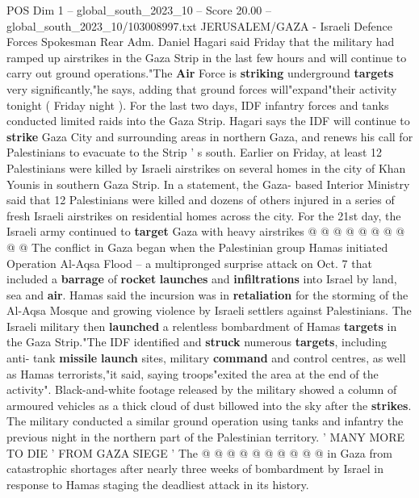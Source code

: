 \begin{textsample}{POS Dim 1 – global\_south\_2023\_10 – Score 20.00 – global\_south\_2023\_10/103008997.txt}  \label{ex:f1_pos_056}
JERUSALEM/GAZA - Israeli Defence Forces Spokesman Rear Adm.
Daniel Hagari said Friday that the military had ramped up airstrikes in the Gaza Strip in the last few hours and will continue to carry out ground operations."The \textbf{Air} Force is \textbf{striking} underground \textbf{targets} very significantly,"he says, adding that ground forces will"expand"their activity tonight ( Friday night ).
For the last two days, IDF infantry forces and tanks conducted limited raids into the Gaza Strip.
Hagari says the IDF will continue to \textbf{strike} Gaza City and surrounding areas in northern Gaza, and renews his call for Palestinians to evacuate to the Strip ' s south.
Earlier on Friday, at least 12 Palestinians were killed by Israeli airstrikes on several homes in the city of Khan Younis in southern Gaza Strip.
In a statement, the Gaza- based Interior Ministry said that 12 Palestinians were killed and dozens of others injured in a series of fresh Israeli airstrikes on residential homes across the city.
For the 21st day, the Israeli army continued to \textbf{target} Gaza with heavy airstrikes @ @ @ @ @ @ @ @ @ @ The conflict in Gaza began when the Palestinian group Hamas initiated Operation Al-Aqsa Flood -- a multipronged surprise attack on Oct. 7 that included a \textbf{barrage} of \textbf{rocket} \textbf{launches} and \textbf{infiltrations} into Israel by land, sea and \textbf{air}.
Hamas said the incursion was in \textbf{retaliation} for the storming of the Al-Aqsa Mosque and growing violence by Israeli settlers against Palestinians.
The Israeli military then \textbf{launched} a relentless bombardment of Hamas \textbf{targets} in the Gaza Strip."The IDF identified and \textbf{struck} numerous \textbf{targets}, including anti- tank \textbf{missile} \textbf{launch} sites, military \textbf{command} and control centres, as well as Hamas terrorists,"it said, saying troops"exited the area at the end of the activity".
Black-and-white footage released by the military showed a column of armoured vehicles as a thick cloud of dust billowed into the sky after the \textbf{strikes}.
The military conducted a similar ground operation using tanks and infantry the previous night in the northern part of the Palestinian territory. ' MANY MORE TO DIE ' FROM GAZA SIEGE ' The @ @ @ @ @ @ @ @ @ @ in Gaza from catastrophic shortages after nearly three weeks of bombardment by Israel in response to Hamas staging the deadliest attack in its history.

\end{textsample}
